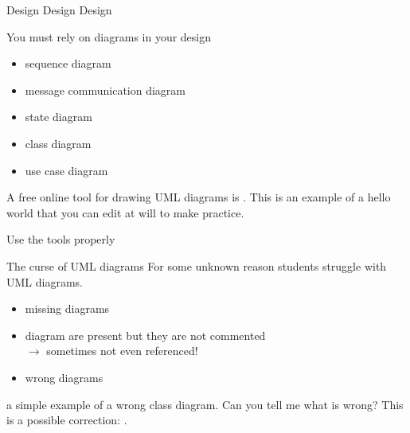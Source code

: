\documentclass[presentation]{beamer}\mode<presentation>{\usetheme{AMSBolognaFC}}
\begin{document}
\begin{frame}[c,allowframebreaks]{Design Design Design}
    \framebreak
    
    \vfill
    \begin{block}{You must rely on diagrams in your design}
        \begin{itemize}
            \item sequence diagram
            \item message communication diagram
            \item state diagram
            \item class diagram
            \item use case diagram
        \end{itemize}
    \end{block}
    A free online tool for drawing UML diagrams is .
    This is an example of a hello world  that you can edit at will to make practice.

\end{frame}
    
\begin{frame}[c,allowframebreaks]{Use the tools properly}
    
    \begin{figure}
        \centering
    \end{figure}
    
    \framebreak
    
    \begin{block}{The curse of UML diagrams}
        For some unknown reason students struggle with UML diagrams.
        \begin{itemize}
            \item missing diagrams
            \item diagram are present but they are not commented
            \\
            $\rightarrow$ \alert{sometimes not even referenced!}
            \item wrong diagrams
        \end{itemize}
    \end{block}
     a simple example of a wrong class diagram.
    Can you tell me what is wrong?
    This is a possible correction: .
\end{frame}
\end{document}
